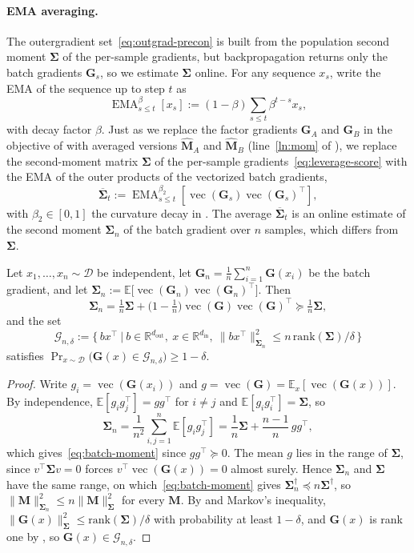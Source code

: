 \documentclass{article}
\renewcommand{\vec}{\operatorname{vec}}
\newcommand{\mat}[1]{\bm{#1}}
\newcommand{\cD}{\mathcal{D}}
\newcommand{\R}{\mathbb{R}}
\newcommand{\E}{\mathbb{E}}
\newcommand{\EE}[2]{\mathbb{E}_{#1}\left[#2\right] }
\DeclareMathOperator{\EMA}{EMA}
\begin{document}
\paragraph{EMA averaging.} The outergradient set~\eqref{eq:outgrad-precon} is built from the population second moment $\mat{\Sigma}$ of the per-sample gradients, but backpropagation returns only the batch gradients $\mat{G}_s$, so we estimate $\mat{\Sigma}$ online. For any sequence $x_s$, write the EMA of the sequence up to step $t$ as
\[
  \EMA^{\beta}_{s\le t}[x_s]:=(1-\beta)\sum_{s\le t}\beta^{t-s} x_s,
\]
with decay factor $\beta$. Just as we replace the factor gradients $\mat{G}_A$ and $\mat{G}_B$ in the objective of  with averaged versions $\widehat{\mat{M}}_A$ and $\widehat{\mat{M}}_B$ (line~\ref{ln:mom} of ), we replace the second-moment matrix $\mat{\Sigma}$ of the per-sample gradients~\eqref{eq:leverage-score} with the EMA of the outer products of the vectorized batch gradients,
\[
  \overline{\mat{\Sigma}}_t:=\EMA^{\beta_2}_{s\le t}[\vec(\mat{G}_s) \vec(\mat{G}_s)^\top],
\]
with $\beta_2\in [0, 1]$ the curvature decay in . The average $\overline{\mat{\Sigma}}_t$ is an online estimate of the second moment $\mat{\Sigma}_n$ of the batch gradient over $n$ samples, which differs from $\mat{\Sigma}$.
\begin{lemma}\label{lem:batch-moment}
Let $x_1,\dots,x_n\sim\cD$ be independent, let $\mat{G}_n=\frac1n\sum_{i=1}^n\mat{G}(x_i)$ be the batch gradient, and let $\mat{\Sigma}_n:=\E\bigl[\vec(\mat{G}_n)\vec(\mat{G}_n)^\top\bigr]$. Then
\begin{equation}\label{eq:batch-moment}
  \mat{\Sigma}_n=\tfrac1n\mat{\Sigma}+\bigl(1-\tfrac1n\bigr)\vec(\mat{G})\vec(\mat{G})^\top\succeq\tfrac1n\mat{\Sigma},
\end{equation}
and the set
\[
  \mathcal{G}_{n,\delta}:=\bigl\{\, bx^\top ~\big|~ b\in\R^{d_{\mathrm{out}}},\ x\in\R^{d_{\mathrm{in}}},\ \|bx^\top\|_{\mat{\Sigma}_n}^2\le n\,\mathrm{rank}(\mat{\Sigma})/\delta \,\bigr\}
\]
satisfies $\Pr_{x\sim\cD}\bigl(\mat{G}(x)\in\mathcal{G}_{n,\delta}\bigr)\ge1-\delta$.
\end{lemma}
\begin{proof}
Write $g_i=\vec(\mat{G}(x_i))$ and $g=\vec(\mat{G})=\EE{x}{\vec(\mat{G}(x))}$. By independence, $\E[g_ig_j^\top]=gg^\top$ for $i\neq j$ and $\E[g_ig_i^\top]=\mat{\Sigma}$, so
\[
  \mat{\Sigma}_n=\frac1{n^2}\sum_{i,j=1}^n\E[g_ig_j^\top]=\frac1n\mat{\Sigma}+\frac{n-1}{n}\,gg^\top,
\]
which gives~\eqref{eq:batch-moment} since $gg^\top\succeq0$. The mean $g$ lies in the range of $\mat{\Sigma}$, since $v^\top\mat{\Sigma}v=0$ forces $v^\top\vec(\mat{G}(x))=0$ almost surely. Hence $\mat{\Sigma}_n$ and $\mat{\Sigma}$ have the same range, on which~\eqref{eq:batch-moment} gives $\mat{\Sigma}_n^\dagger\preceq n\mat{\Sigma}^\dagger$, so $\|\mat{M}\|_{\mat{\Sigma}_n}^2\le n\|\mat{M}\|_{\mat{\Sigma}}^2$ for every $\mat{M}$. By  and Markov's inequality, $\|\mat{G}(x)\|_{\mat{\Sigma}}^2\le\mathrm{rank}(\mat{\Sigma})/\delta$ with probability at least $1-\delta$, and $\mat{G}(x)$ is rank one by , so $\mat{G}(x)\in\mathcal{G}_{n,\delta}$.
\end{proof}
\end{document}
